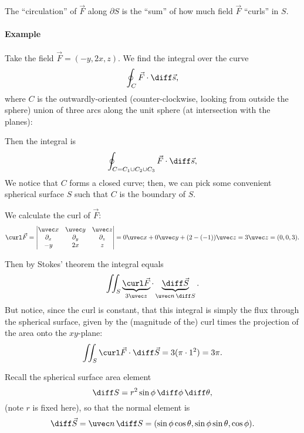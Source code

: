 \documentclass{multi}
\begin{document}
The ``circulation'' of \(\vec F\) along \(\partial S\) is the ``sum'' of how much field \(\vec F\) ``curls'' in \(S\).

\paragraph{Example}

Take the field \(\vec F = (-y, 2x, z)\). We find the integral over the curve 
\[
    \oint_C \vec F \cdot \diff \vec s,
\]
where \(C\) is the outwardly-oriented (counter-clockwise, looking from outside the sphere) union of three arcs along the unit sphere (at intersection with the planes):
\begin{center}
  
\end{center}


Then the integral is
\[
    \oint_{C = C_1 \cup C_2 \cup C_3} \vec F \cdot \diff \vec s,
\]
We notice that \(C\) forms a closed curve; then, we can pick some convenient spherical surface \(S\) such that \(C\) is the boundary of \(S\). 

We calculate the curl of \(\vec F\):
\[
    \curl \vec F = 
    \begin{vmatrix}
        \uvec x & \uvec y & \uvec z \\
        \partial_x & \partial_y & \partial_z \\
        -y & 2x & z
    \end{vmatrix}
    =
    0 \uvec x + 0 \uvec y + (2 - (-1)) \uvec z
    = 3 \uvec z
    = (0, 0, 3).
\]

Then by Stokes' theorem the integral equals
\[
    \iint_S \underbrace{\curl \vec F}_{3 \uvec z} \cdot \underbrace{\diff \vec S}_{\uvec n \, \diff S}.
    \]
    But notice, since the curl is constant, that this integral is simply the
    flux through the spherical surface, given by the (magnitude of the) curl times the projection of the area onto the \(xy\)-plane:
    \[\iint_S \curl \vec F \cdot \diff \vec S = 3 (\pi \cdot 1^2) = 3 \pi.\]

    

Recall the spherical surface area element
\[
    \diff S = r^2 \sin \phi \, \diff \phi \, \diff \theta,
\]
(note \(r\) is fixed here), so that the normal element is
\[
    \diff \vec S = \uvec n \, \diff S = (\sin\phi \cos\theta, \sin \phi \sin \theta, \cos \phi).
\]
\end{document}
